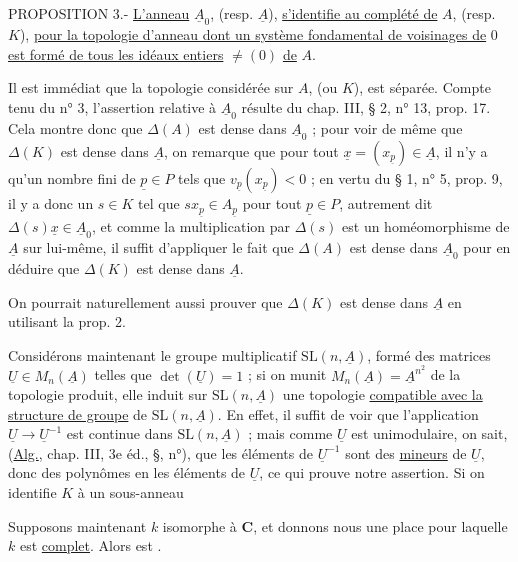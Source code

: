 PROPOSITION 3.- \uline{L'anneau} $\underline A_0$, (resp. $\underline A$), \uline{s'identifie au complété de} $A$, (resp. $K$), \uline{pour la topologie d'anneau dont un système fondamental de voisinages de} $0$ \uline{est formé de tous les idéaux entiers} $\ne(0)$ \uline{de} $A$.

Il est immédiat que la topologie considérée sur $A$, (ou $K$), est séparée. Compte tenu du n° 3, l'assertion relative à $\underline A_0$ résulte du chap. III, § 2, n° 13, prop. 17. Cela montre donc que $\Delta(A)$ est dense dans $\underline A_0$ ; pour voir de même que $\Delta(K)$ est dense dans $\underline A$, on remarque que pour tout $\underline x=(x_{\underline p})\in\underline A$, il n'y a qu'un nombre fini de $\underline p\in P$ tels que $v_{\underline p}(x_{\underline p})<0$ ; en vertu du § 1, n° 5, prop. 9, il y a donc un $s\in K$ tel que $sx_{\underline p}\in\hat A_{\underline p}$ pour tout $\underline p\in P$, autrement dit $\Delta(s)\underline x\in\underline A_0$, et comme la multiplication par $\Delta(s)$ est un homéomorphisme de $\underline A$ sur lui-même, il suffit d'appliquer le fait que $\Delta(A)$ est dense dans $\underline A_0$ pour en déduire que $\Delta(K)$ est dense dans $\underline A$.

On pourrait naturellement aussi prouver que $\Delta(K)$ est dense dans $\underline A$ en utilisant la prop. 2.

Considérons maintenant le groupe multiplicatif $\mathrm{SL}(n,\underline A)$, formé des matrices $\underline U\in M_n(\underline A)$ telles que $\det(\underline U)=1$ ; si on munit $M_n(\underline A)=\underline A^{n^2}$ de la topologie produit, elle induit sur $\mathrm{SL}(n,\underline A)$ une topologie \uline{compatible avec la structure de groupe} de $\mathrm{SL}(n,\underline A)$. En effet, il suffit de voir que l'application $\underline U\longrightarrow\underline U^{-1}$ est continue dans $\mathrm{SL}(n,\underline A)$ ; mais comme $\underline U$ est unimodulaire, on sait, (\uline{Alg.}, chap. III, 3e éd., §\quad, n°\quad), que les éléments de $\underline U^{-1}$ sont des \uline{mineurs} de $\underline U$, donc des polynômes en les éléments de $\underline U$, ce qui prouve notre assertion. Si on identifie $K$ à un sous-anneau

Supposons maintenant $k$ isomorphe à $\mathbf C$, et donnons nous une place pour laquelle $k$ est \uline{complet}. Alors 
est .

